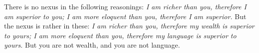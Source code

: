 There is  no nexus  in the  following reasonings: \emph{I  am richer  than you,
therefore I  am superior to you;  I am more  eloquent than you, therefore  I am
superior.}  But the  nexus is  rather  in these:  \emph{I am  richer than  you,
therefore  my  wealth is  superior  to  yours; I  am  more  eloquent than  you,
therefore my language  is superior to yours.}  But you are not  wealth, and you
are not language.
